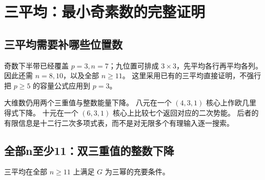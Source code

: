 \chapter{三平均：最小奇素数的完整证明}\label{ch:three}

\section{三平均需要补哪些位置数}
奇数下半带已经覆盖 $p=3,n=7$；九位置可排成 $3\times3$，先平均各行再平均各列。
因此还需 $n=8,10$，以及全部 $n\ge11$。
这里采用已有的三平均直接证明，不强行把 $p\ge5$ 的容量公式应用到 $p=3$。

大维数仍用两个三重值与整数能量下降。
八元在一个 $(4,3,1)$ 核心上作欧几里得式下降。
十元在一个 $(6,3,1)$ 核心上比较七个返回对应的二次势能。
后者的有限信息是十二行二次多项式表，而不是对无限多个有理输入逐一搜索。

\section{全部n至少11：双三重值的整数下降}

\begin{lemma}[三平均的全部n至少11]\label{lem:triple-large}
三平均在全部 $n\ge11$ 上满足 $G$ 为三幂的充要条件。
\end{lemma}

